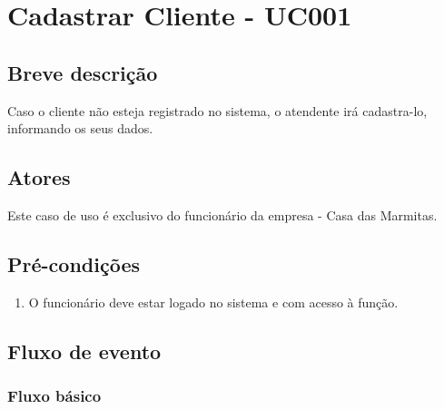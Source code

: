 \chapter{Cadastrar Cliente - UC001} \label{uc001}
 
\section{Breve descrição}
 
Caso o cliente não esteja registrado no sistema, o atendente irá cadastra-lo, informando os seus dados.

\section{Atores}

Este caso de uso é exclusivo do funcionário da empresa - Casa das Marmitas.

\section{Pré-condições}

\begin{enumerate}
	\item O funcionário deve estar logado no sistema e com acesso à função.
\end{enumerate}

\section{Fluxo de evento}

\subsection{Fluxo básico}

